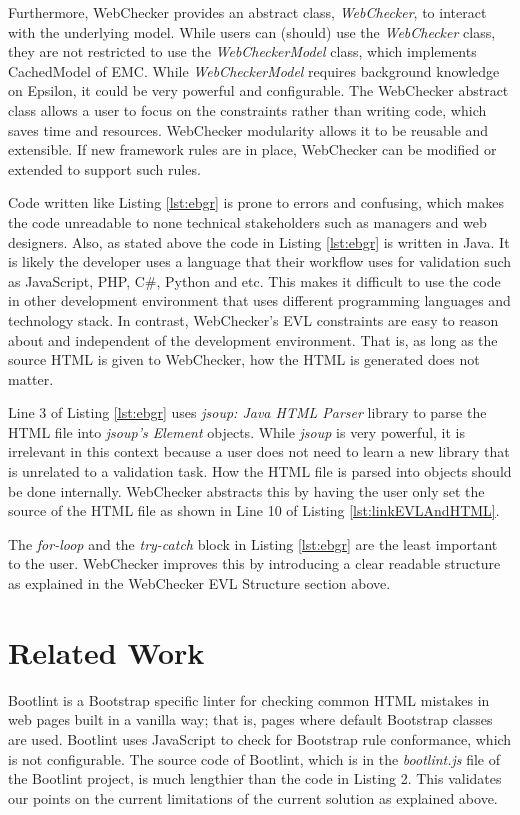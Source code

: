 \documentclass[conference]{IEEETran}
\begin{document}
Furthermore, WebChecker provides an abstract class, \textit{WebChecker},  to interact with the underlying model. While users can (should) use the \textit{WebChecker} class, they are not restricted to use the \textit{WebCheckerModel} class, which implements CachedModel of EMC. While \textit{WebCheckerModel} requires background knowledge on Epsilon, it could be very powerful and configurable. The WebChecker abstract class allows a user to focus on the constraints rather than writing code, which saves time and resources. WebChecker modularity allows it to be reusable and extensible. If new framework rules are in place, WebChecker can be modified or extended to support such rules. 

Code written like Listing \ref{lst:ebgr} is prone to errors and confusing, which makes the code unreadable to none technical stakeholders such as managers and web designers. Also, as stated above the code in Listing  \ref{lst:ebgr}  is written in Java. It is likely the developer uses a language that their workflow uses for validation such as JavaScript, PHP, C\#, Python and etc. This makes it difficult to use the code in other development environment that uses different programming languages and technology stack. In contrast, WebChecker's EVL constraints are easy to reason about and independent of the development environment. That is, as long as the source HTML is given to WebChecker, how the HTML is generated does not matter. 

Line 3 of Listing \ref{lst:ebgr} uses \textit{jsoup: Java HTML Parser}\cite{jsoup} library to parse the HTML file into \textit{jsoup's Element} objects. While \textit{jsoup} is very powerful, it is irrelevant in this context because a user does not need to learn a new library that is unrelated to a validation task. How the HTML file is parsed into objects should be done internally. WebChecker abstracts this by having the user only set the source of the HTML file as shown in Line 10 of Listing \ref{lst:linkEVLAndHTML}.           


The \textit{for-loop} and the \textit{try-catch} block in Listing \ref{lst:ebgr} are the least important to the user. WebChecker improves this by introducing a clear readable structure as explained in the WebChecker EVL Structure section above.  


\section{Related Work}
Bootlint \cite{bootlint} is a Bootstrap specific linter for checking common HTML mistakes in web pages built in a vanilla way; that is, pages where default Bootstrap classes are used. Bootlint uses JavaScript to check for Bootstrap rule conformance, which is not configurable. The source code of Bootlint, which is in the \textit{bootlint.js} file of the Bootlint project, is much lengthier than the code in Listing 2. This validates our points on the current limitations of the current solution as explained above. 
\end{document}

